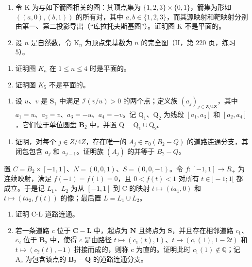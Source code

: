 \begin{enumerate}
\def\labelenumi{\arabic{enumi})}
\setcounter{enumi}{20}
\item
  令 K 为与如下箭图相关的图：其顶点集为 \(\{1,2,3\} \times \{0,1\}\)，箭集为形如 \(((a,0),(b,1))\) 的所有对，其中 \(a,b\in \{1,2,3\}\)，而其源映射和靶映射分别由第一、第二投影导出（“库拉托夫斯基图”）。证明图 K 不是平面的。
\item
  设 \(n\) 是自然数，令 \(\mathrm{K}_n\) 为顶点集基数为 \(n\) 的完全图（II，第 220 页，练习 5）。
\end{enumerate}

\begin{enumerate}
\def\labelenumi{\alph{enumi})}
\item
  证明图 \(K_{n}\) 在 \(1 \leqslant n \leqslant 4\) 时是平面的。
\item
  证明图 \(K_{5}\) 不是平面的。
\end{enumerate}

\begin{enumerate}
\def\labelenumi{\arabic{enumi})}
\setcounter{enumi}{22}
\tightlist
\item
   设 \(u\)、\(v\) 是 \(\mathbf{S}_1\) 中满足 \(\mathcal{I}(v / u) > 0\) 的两个点；定义族 \((a_j)_{j \in \mathbf{Z} / 4\mathbf{Z}}\)，其中 \(a_1 = u\)、\(a_2 = v\)、\(a_3 = -u\)、\(a_4 = -v\)。记 \(\mathrm{Q}_1\)、\(\mathrm{Q}_2\) 为线段 \([a_1, a_3]\) 和 \([a_2, a_4]\)，它们位于单位圆盘 \(\mathbf{B}_2\) 中，并置 \(\mathrm{Q} = \mathrm{Q}_1 \cup \mathrm{Q}_2\)。
\end{enumerate}

\begin{enumerate}
\def\labelenumi{\alph{enumi})}
\tightlist
\item
  证明，对每个 \(j \in Z/4Z\)，存在唯一的 \(A_{j} \in \pi_{0}(B_{2}-Q)\) 的道路连通分支，其闭包包含 \(a_{j}\) 和 \(a_{j-1}\)。证明族 \((A_{j})\) 的并等于 \(B_{2}-Q\)。
\end{enumerate}

  置 \(C = B_{2} \times [-1, 1]\)、\(N = (0, 0, 1)\)、\(S = (0, 0, -1)\)。令 \(f: [-1, 1] \to R_{+}\) 为连续映射，满足 \(f(-1) = f(1) = 0\)，且 \(0 < f(t) < 1\) 对所有 \(t \in ]-1; 1[\) 都成立。于是记 \(L_{1}\)、\(L_{2}\) 为从 \([-1, 1]\) 到 C 的映射 \(t \mapsto (ta_{1}, 0)\) 和 \(t \mapsto (ta_{2}, f(t))\) 的像；最后置 \(L = L_{1} \cup L_{2}\)。

\begin{enumerate}
\def\labelenumi{\alph{enumi})}
\setcounter{enumi}{1}
\item
  证明 C-L 道路连通。
\item
  若一条道路 \(c\) 位于 \(\mathbf{C} - \mathbf{L}\) 中，起点为 \(\mathbf{N}\) 且终点为 \(\mathbf{S}\)，并且存在相邻道路 \(c_1\)、\(c_2\) 位于 \(\mathbf{B}_2\) 中，使得 \(c\) 是由路径 \(t \mapsto (c_1(t), 1)\)、\(t \mapsto (c_1(1), 1 - 2t)\) 和 \(t \mapsto (c_2(t), -1)\) 拼接而成的，则称 c 为直的。证明此时 \(c_1(1) \not\in \mathbb{Q}\)；记 \(\mathrm{A}_c\) 为包含该点的 \(\mathbf{B}_2 - \mathbf{Q}\) 的道路连通分支。
\end{enumerate}

